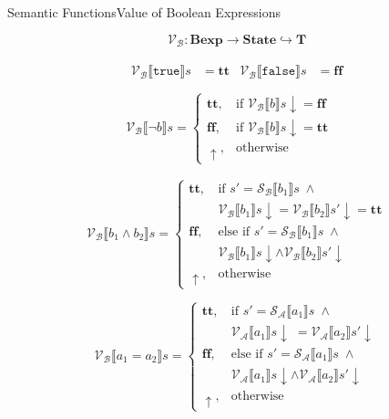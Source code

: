 \documentclass{beamer}
\newcommand{\Bexp}{\textbf{Bexp}}
\newcommand{\State}{\textbf{State}}
\newcommand{\T}{\textbf{T}}
\newcommand{\true}{\texttt{true}}
\newcommand{\false}{\texttt{false}}
\newcommand{\sem}[2]{\mathcal{#1} \llbracket #2 \rrbracket}
\newcommand{\tr}{\mathbf{tt}}
\newcommand{\ff}{\mathbf{ff}}
\newcommand{\undefined}{\uparrow}
\newcommand{\defined}{\!\downarrow}
\begin{document}
\begin{frame}{Semantic Functions}{Value of Boolean Expressions}

    $$\mathcal{V_B} : \Bexp \to \State \hookrightarrow \T$$
    \begin{overprint}
        \begin{gather*}
            \begin{aligned}
                \sem{V_B}{\true}s  & = \tr &
                \sem{V_B}{\false}s & = \ff   \\
            \end{aligned} \\
            \sem{V_B}{\neg b}s =
            \begin{cases}
                \tr,        & \mbox{if } \sem{V_B}{b}s \defined = \ff \\
                \ff,        & \mbox{if } \sem{V_B}{b}s \defined = \tr \\
                \undefined, & \mbox{otherwise}
            \end{cases}
        \end{gather*}

        \begin{equation*}
            \sem{V_B}{b_1 \wedge b_2}s =
            \begin{cases}
                \tr,
                 & \mbox{if } s' = \sem{S_B}{b_1}s \;\wedge                   \\
                 & \sem{V_B}{b_1}s \defined = \sem{V_B}{b_2}s' \defined = \tr \\
                \ff,
                 & \mbox{else if } s' = \sem{S_B}{b_1}s \;\wedge              \\
                 & \sem{V_B}{b_1}s \defined \wedge \sem{V_B}{b_2}s' \defined  \\
                \undefined,
                 & \mbox{otherwise}
            \end{cases}
        \end{equation*}

        \begin{equation*}
            \sem{V_B}{a_1 = a_2}s =
            \begin{cases}
                \tr,
                 & \mbox{if } s' = \sem{S_A}{a_1}s \;\wedge                  \\
                 & \sem{V_A}{a_1}s \defined \;= \sem{V_A}{a_2}s' \defined    \\
                \ff,
                 & \mbox{else if } s' = \sem{S_A}{a_1}s \;\wedge             \\
                 & \sem{V_A}{a_1}s \defined \wedge \sem{V_A}{a_2}s' \defined \\
                \undefined,
                 & \mbox{otherwise}
            \end{cases}
        \end{equation*}


\end{overprint}
\end{frame}
\end{document}

